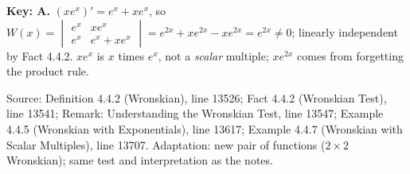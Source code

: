 \documentclass[11pt,a4paper]{article}
\newcommand{\Src}[1]{{\footnotesize\color{black!65}Source: #1}}
\begin{document}
\textbf{Key: A.} $(xe^{x})'=e^{x}+xe^{x}$, so $W(x)=\begin{vmatrix}e^{x}&xe^{x}\\e^{x}&e^{x}+xe^{x}\end{vmatrix}=e^{2x}+xe^{2x}-xe^{2x}=e^{2x}\neq0$; linearly independent by Fact 4.4.2. $xe^{x}$ is $x$ times $e^{x}$, not a \emph{scalar} multiple; $xe^{2x}$ comes from forgetting the product rule.\par
\Src{Definition 4.4.2 (Wronskian), line 13526; Fact 4.4.2 (Wronskian Test), line 13541; Remark: Understanding the Wronskian Test, line 13547; Example 4.4.5 (Wronskian with Exponentials), line 13617; Example 4.4.7 (Wronskian with Scalar Multiples), line 13707. Adaptation: new pair of functions ($2\times2$ Wronskian); same test and interpretation as the notes.}\par
\end{document}
